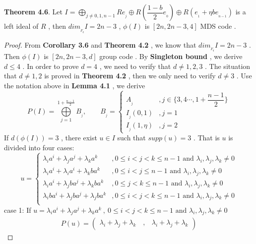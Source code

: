 \documentclass{article}
\begin{document}
\textbf{Theorem 4.6}. Let $I=\mathop{\bigoplus}\limits_{j\neq 0,1,n-1}Re_{_j}\oplus R(\dfrac{1-b}{2}e_{_0})\oplus R(e_{_1}+\eta be_{_{n-1}})$ is a left ideal of $R$ , then $dim_{_{F_q}}I=2n-3$ , $\phi(I)$ is $[2n,2n-3,4]$ MDS code .
\begin{proof}
From \textbf{Corollary 3.6} and \textbf{Theorem 4.2} , we know that $dim_{_{F_q}}I=2n-3$ . Then $\phi(I)$ is $[2n,2n-3,d]$ group code . By \textbf{Singleton bound} , we derive $d\leq 4$ . In order to prove $d=4$ , we need to verify that $d\neq 1,2,3$ . The situation that $d\neq 1,2$ is proved in \textbf{Theorem 4.2} , then we only need to verify $d\neq3$ . Use the notation above in \textbf{Lemma 4.1} , we derive
\[
P(I)=\bigoplus\limits_{j=1}^{1+\frac{n-1}{2}}B_{_j},\qquad 
    B_{_j}=\begin{cases}
    A_{_j}&,j\in{\{3,4\cdots,1+\dfrac{n-1}{2}\}}\\
    I_{_j}(0,1)&,j=1\\
    I_{_j}(1,\eta)&,j=2
\end{cases}
\]
If $d(\phi(I))=3$ , there exist $u\in{I}$ such that $supp(u)=3$ . That is $u$ is divided into four cases:
\[
u=\begin{cases}
\lambda_{i}a^{\scriptscriptstyle i}+\lambda_{j}a^{\scriptscriptstyle j}+\lambda_{k}a^{\scriptscriptstyle k}&,0\leq i<j<k\leq n-1 \text{ and } \lambda_i,\lambda_j,\lambda_k\neq0\\
\lambda_{i}a^{\scriptscriptstyle i}+\lambda_{i}a^{\scriptscriptstyle i}+\lambda_{k}ba^{\scriptscriptstyle k}&,0\leq i<j\leq n-1\text{ and }\lambda_i,\lambda_j,\lambda_k\neq0\\
\lambda_{i}a^{\scriptscriptstyle i}+\lambda_{j}ba^{\scriptscriptstyle j}+\lambda_{k}ba^{\scriptscriptstyle k}&,0\leq j<k\leq n-1\text{ and } \lambda_i,\lambda_j,\lambda_k\neq0\\
\lambda_{i}ba^{\scriptscriptstyle i}+\lambda_{j}ba^{\scriptscriptstyle j}+\lambda_{j}ba^{\scriptscriptstyle k}&,0\leq i<j<k\leq n-1 \text{ and } \lambda_i,\lambda_j,\lambda_k\neq0\\
\end{cases}
\]
case 1: If $u=\lambda_{i}a^{\scriptscriptstyle i}+\lambda_{j}a^{\scriptscriptstyle j}+\lambda_{k}a^{\scriptscriptstyle k}\:,\:0\leq i<j<k\leq n-1 \text{ and } \lambda_i,\lambda_j,\lambda_k\neq0$
\begin{align*}
    P(u)=\begin{pmatrix}
          \lambda_i+\lambda_j+\lambda_k\quad,&\lambda_i+\lambda_j+\lambda_k
        \end{pmatrix}

\end{align*}
\end{proof}
\end{document}
